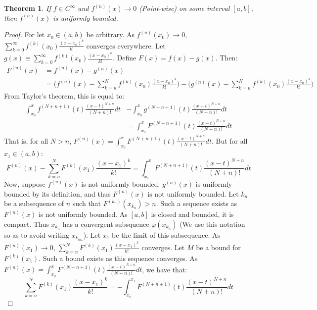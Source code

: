 \documentclass[12pt,oneside]{book}
\theoremstyle{mystyle}
\newtheorem{theorem}{Theorem}[section]
\begin{document}
\begin{theorem}
If $f\in C^{\infty}$ and $f^{(n)}(x)\rightarrow 0$ (Point-wise) on some interval $[a,b]$, then $f^{(n)}(x)$ is uniformly bounded.
\end{theorem}
\begin{proof}
For let $x_0\in (a,b)$ be arbitrary. As $f^{(n)}(x_0)\rightarrow 0$, $\sum_{k=0}^{\infty} f^{(k)}(x_0)\frac{(x-x_0)^{k}}{k!}$ converges everywhere. Let $g(x)\equiv \sum_{k=0}^{\infty} f^{(k)}(x_0)\frac{(x-x_0)^{k}}{k!}$. Define $F(x) = f(x)-g(x)$. Then:
\begin{align*}
    F^{(n)}(x) &= f^{(n)}(x)-g^{(n)}(x)\\
    &= \bigg(f^{(n)}(x)-\sum_{k=n}^{N} f^{(k)}(x_0)\frac{(x-x_0)^{k}}{k!}\bigg)-\bigg(g^{(n)}(x)-\sum_{k=n}^{N} f^{(k)}(x_0)\frac{(x-x_0)^{k}}{k!}\bigg)    
\end{align*}
%
From Taylor's theorem, this is equal to:
%
\begin{align*}
    \int_{x_0}^{x} f^{(N+n+1)}(t)\frac{(x-t)^{N+n}}{(N+n)!}dt &- \int_{x_0}^{x} g^{(N+n+1)}(t)\frac{(x-t)^{N+n}}{(N+n)!}dt\\
    &= \int_{x_0}^{x} F^{(N+n+1)}(t)\frac{(x-t)^{N+n}}{(N+n)!}dt    
\end{align*}
%
That is, for all $N>n$, $F^{(n)}(x) = \int_{x_0}^{x} F^{(N+n+1)}(t)\frac{(x-t)^{N+n}}{(N+n)!}dt$. But for all $x_1 \in (a,b)$:
%
\begin{equation*}
    F^{(n)}(x)-\sum_{k=n}^{N} F^{(k)}(x_1)\frac{(x-x_1)^k}{k!} = \int_{x_1}^{x} F^{(N+n+1)}(t)\frac{(x-t)^{N+n}}{(N+n)!}dt    
\end{equation*}
%
Now, suppose $f^{(n)}(x)$ is not uniformly bounded. $g^{(n)}(x)$ is uniformly bounded by its definition, and thus $F^{(n)}(x)$ is not uniformly bounded. Let ${k_n}$ be a subsequence of $n$ such that $F^{(k_n)}(x_{k_n})>n$. Such a sequence exists as $F^{(n)}(x)$ is not uniformly bounded. As $[a,b]$ is closed and bounded, it is compact. Thus $x_{k_n}$ has a convergent subsquence $\varphi(x_{k_n})$ (We use this notation so as to avoid writing $x_{k_{m_n}}$). Let $x_1$ be the limit of this subsequence. As $F^{(n)}(x_1)\rightarrow 0$, $\sum_{k=n}^{N} F^{(k)}(x_1)\frac{(x-x_1)^k}{k!}$ converges. Let $M$ be a bound for $F^{(k)}(x_1)$. Such a bound exists as this sequence converges. As $F^{(n)}(x) = \int_{x_0}^{x} F^{(N+n+1)}(t)\frac{(x-t)^{N+n}}{(N+n)!}dt$, we have that:
%
\begin{equation*}
    \sum_{k=n}^{N} F^{(k)}(x_1)\frac{(x-x_1)^k}{k!} = -\int_{x_0}^{x_1} F^{(N+n+1)}(t)\frac{(x-t)^{N+n}}{(N+n)!}dt    

\end{equation*}
\end{proof}
\end{document}
